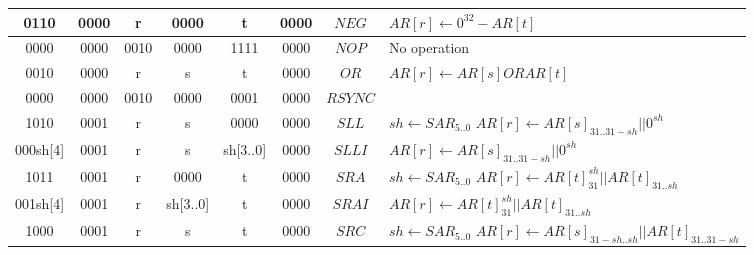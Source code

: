 \begin{smalltables}
\begin{longtable}{llllllllllllllllllllllll  p{1cm}  p{6cm} | }
		\multicolumn{4}{|c|}{0110} & \multicolumn{4}{c|}{0000} & \multicolumn{4}{c|}{r} & \multicolumn{4}{c|}{0000} & \multicolumn{4}{c|}{t} & \multicolumn{4}{c|}{0000} & \multicolumn{1}{c|}{$NEG$} & $AR[r] \leftarrow 0^{32}-AR[t]$ \\ \hline
		\multicolumn{4}{|c|}{0000} & \multicolumn{4}{c|}{0000} & \multicolumn{4}{c|}{0010} & \multicolumn{4}{c|}{0000} & \multicolumn{4}{c|}{1111} & \multicolumn{4}{c|}{0000} & \multicolumn{1}{c|}{$NOP$} &  No operation \\ \hline
        \multicolumn{4}{|c|}{0010} & \multicolumn{4}{c|}{0000} & \multicolumn{4}{c|}{r} & \multicolumn{4}{c|}{s} & \multicolumn{4}{c|}{t} & \multicolumn{4}{c|}{0000} & \multicolumn{1}{c|}{$OR$} & $AR[r] \leftarrow AR[s] OR AR[t]$ \\ \hline		\multicolumn{4}{|c|}{0000} & \multicolumn{4}{c|}{0000} & \multicolumn{4}{c|}{0010} & \multicolumn{4}{c|}{0000} & \multicolumn{4}{c|}{0001} & \multicolumn{4}{c|}{0000} & \multicolumn{1}{c|}{$RSYNC$} &  \\ \hline
        \multicolumn{4}{|c|}{1010} & \multicolumn{4}{c|}{0001} & \multicolumn{4}{c|}{r} & \multicolumn{4}{c|}{s} & \multicolumn{4}{c|}{0000} & \multicolumn{4}{c|}{0000} & \multicolumn{1}{c|}{$SLL$} & $sh \leftarrow SAR_{5..0}$ \newline $AR[r] \leftarrow AR[s]_{31..31-sh} || 0^{sh}$ \\ \hline
        \multicolumn{4}{|c|}{000sh[4]} & \multicolumn{4}{c|}{0001} & \multicolumn{4}{c|}{r} & \multicolumn{4}{c|}{s} & \multicolumn{4}{c|}{sh[3..0]} & \multicolumn{4}{c|}{0000} & \multicolumn{1}{c|}{$SLLI$} & $AR[r] \leftarrow AR[s]_{31..31-sh} || 0^{sh}$ \\ \hline
        \multicolumn{4}{|c|}{1011} & \multicolumn{4}{c|}{0001} & \multicolumn{4}{c|}{r} & \multicolumn{4}{c|}{0000} & \multicolumn{4}{c|}{t} & \multicolumn{4}{c|}{0000} & \multicolumn{1}{c|}{$SRA$} & $sh \leftarrow SAR_{5..0}$ \newline $AR[r] \leftarrow AR[t]_{31}^{sh} || AR[t]_{31..sh}$ \\ \hline
        \multicolumn{4}{|c|}{001sh[4]} & \multicolumn{4}{c|}{0001} & \multicolumn{4}{c|}{r} & \multicolumn{4}{c|}{sh[3..0]} & \multicolumn{4}{c|}{t} & \multicolumn{4}{c|}{0000} & \multicolumn{1}{c|}{$SRAI$} & $AR[r] \leftarrow AR[t]_{31}^{sh} || AR[t]_{31..sh}$ \\ \hline
        \multicolumn{4}{|c|}{1000} & \multicolumn{4}{c|}{0001} & \multicolumn{4}{c|}{r} & \multicolumn{4}{c|}{s} & \multicolumn{4}{c|}{t} & \multicolumn{4}{c|}{0000} & \multicolumn{1}{c|}{$SRC$} & $sh \leftarrow SAR_{5..0}$ \newline $AR[r] \leftarrow AR[s]_{31-sh..sh} || AR[t]_{31..31-sh}$ \\ \hline

\end{longtable}
\end{smalltables}
